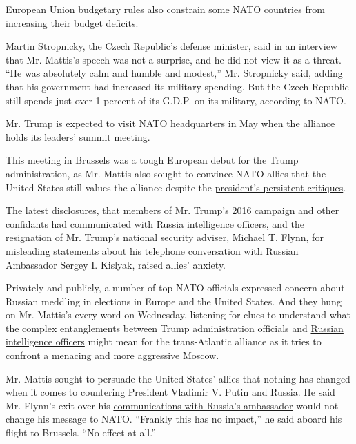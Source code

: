 European Union budgetary rules also constrain some NATO countries from
increasing their budget deficits.

Martin Stropnicky, the Czech Republic's defense minister, said in an
interview that Mr. Mattis's speech was not a surprise, and he did not
view it as a threat. ``He was absolutely calm and humble and modest,''
Mr. Stropnicky said, adding that his government had increased its
military spending. But the Czech Republic still spends just over 1
percent of its G.D.P. on its military, according to NATO.

Mr. Trump is expected to visit NATO headquarters in May when the
alliance holds its leaders' summit meeting.

This meeting in Brussels was a tough European debut for the Trump
administration, as Mr. Mattis also sought to convince NATO allies that
the United States still values the alliance despite the
\href{https://www.nytimes.com/2017/01/15/world/europe/donald-trump-nato.html}{president's
persistent critiques}.

The latest disclosures, that members of Mr. Trump's 2016 campaign and
other confidants had communicated with Russia intelligence officers, and
the resignation of
\href{https://www.nytimes.com/2017/02/14/us/politics/fbi-interviewed-mike-flynn.html}{Mr.
Trump's national security adviser, Michael T. Flynn}, for misleading
statements about his telephone conversation with Russian Ambassador
Sergey I. Kislyak, raised allies' anxiety.

Privately and publicly, a number of top NATO officials expressed concern
about Russian meddling in elections in Europe and the United States. And
they hung on Mr. Mattis's every word on Wednesday, listening for clues
to understand what the complex entanglements between Trump
administration officials and
\href{https://www.nytimes.com/2017/02/14/us/politics/russia-intelligence-communications-trump.html}{Russian
intelligence officers} might mean for the trans-Atlantic alliance as it
tries to confront a menacing and more aggressive Moscow.

Mr. Mattis sought to persuade the United States' allies that nothing has
changed when it comes to countering President Vladimir V. Putin and
Russia. He said Mr. Flynn's exit over his
\href{https://www.nytimes.com/interactive/2017/02/14/us/politics/flynn-call-russia-timeline.html}{communications
with Russia's ambassador} would not change his message to NATO.
``Frankly this has no impact,'' he said aboard his flight to Brussels.
``No effect at all.''

